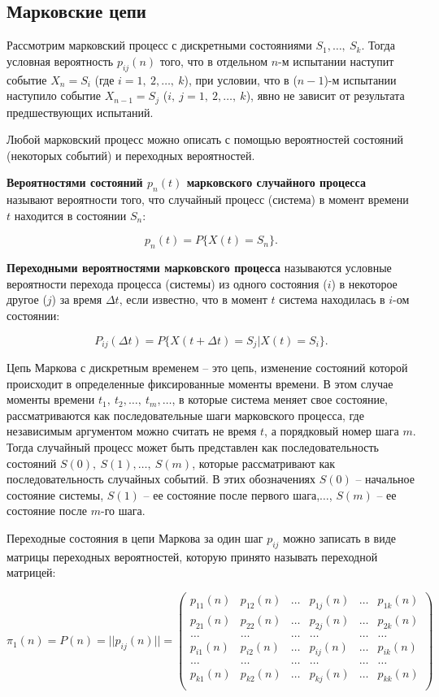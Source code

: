 	\subsection{Марковские цепи}
	Рассмотрим марковский процесс с дискретными состояниями $S_1,\dots,~S_k$. Тогда условная вероятность $p_{ij}(n)$ того, что в отдельном $n$-м испытании наступит событие $X_n = S_i$ (где $i = 1,~2,\dots,~k$), при условии, что в ($n-1$)-м испытании наступило событие $X_{n-1} = S_j$ ($i,~j = 1,~2,\dots,~k$), явно не зависит от результата предшествующих испытаний.
	
	Любой марковский процесс можно описать с помощью вероятностей состояний (некоторых событий) и переходных вероятностей.
	
	\textbf{Вероятностями состояний $p_n(t)$ марковского случайного процесса} называют вероятности того, что случайный процесс (система) в момент времени $t$ находится в состоянии $S_n$:
	
	$$
	p_n(t) = P\{X(t)= S_n\}.
	$$
	
	\textbf{Переходными вероятностями марковского процесса} называются условные вероятности перехода процесса (системы) из одного состояния ($i$) в некоторое другое ($j$) за время $\Delta t$, если известно, что в момент $t$ система находилась в $i$-ом состоянии:
	
	$$
	P_{ij}(\Delta t)=P\{X(t+\Delta t)=S_j\bigg|X(t)=S_i\}.
	$$
	
	Цепь Маркова с дискретным временем -- это цепь, изменение состояний которой происходит в определенные фиксированные моменты времени. В этом случае моменты времени $t_1,~t_2,\dots,~t_m,\dots$, в которые система меняет свое состояние, рассматриваются как последовательные шаги марковского процесса, где независимым аргументом можно считать не время $t$, а порядковый номер шага $m$. Тогда случайный процесс может быть представлен как последовательность состояний $S(0),~S(1),\dots,~S(m)$, которые рассматривают как последовательность случайных событий. В этих обозначениях $S(0)$ -- начальное состояние системы, $S(1)$ -- ее состояние после первого шага,$\dots$, $S(m)$ -- ее состояние после $m$-го шага.
	
	Переходные состояния в цепи Маркова за один шаг $p_{ij}$ можно записать в виде матрицы переходных вероятностей, которую принято называть переходной матрицей:
	
	$$
	\pi_1(n) = P(n) = ||p_{ij}(n)|| = \begin{pmatrix}
		p_{11}(n) & p_{12}(n) & \dots & p_{1j}(n) & \dots & p_{1k}(n) \\
		p_{21}(n) & p_{22}(n) & \dots & p_{2j}(n) & \dots & p_{2k}(n) \\
		\dots & \dots & \dots & \dots & \dots & \dots \\
		p_{i1}(n) & p_{i2}(n) & \dots & p_{ij}(n) & \dots & p_{ik}(n) \\
		\dots & \dots & \dots & \dots & \dots & \dots \\
		p_{k1}(n) & p_{k2}(n) & \dots & p_{kj}(n) & \dots & p_{kk}(n) \\
	\end{pmatrix}
	$$ 
	
